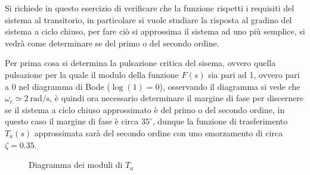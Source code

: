 Si richiede in questo esercizio di verificare che la funzione rispetti i requisiti del sistema al transitorio, in particolare si vuole studiare la risposta
al gradino del sistema a ciclo chiuso, per fare ciò si approssima il sistema ad
uno più semplice, si vedrà come determinare se del primo o del secondo ordine.

Per prima cosa si determina la pulsazione critica del sisema, ovvero quella
pulsazione per la quale il modulo della funzione $F(s)$ sia pari ad 1, ovvero pari a 0 nel diagramma di Bode ($\log(1)=0$), osservando il diagramma si vede che
$\omega_c \simeq \SI{2}{\radian/\second}$, è quindi ora necessario determinare il margine di
fase per discernere se il sistema a ciclo chiuso approssimato
è del primo o del secondo ordine, in questo caso il margine di fase è circa
$35^\circ$, dunque la funzione di trasferimento $T_a(s)$ approssimata sarà
del secondo ordine con uno smorzamento di circa $\zeta = 0.35$.

\begin{figure}[h]
    \centering
    \caption{Diagramma dei moduli di $T_a$}
\end{figure}
